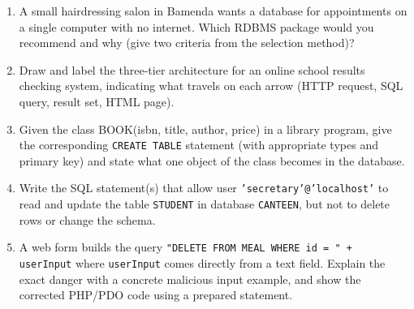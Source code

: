 \documentclass[11pt]{article}
\begin{document}
\begin{exercice}[Practice]
\begin{enumerate}
\item A small hairdressing salon in Bamenda wants a database for appointments on a single computer with no internet. Which RDBMS package would you recommend and why (give two criteria from the selection method)?
\item Draw and label the three-tier architecture for an online school results checking system, indicating what travels on each arrow (HTTP request, SQL query, result set, HTML page).
\item Given the class \textsf{BOOK(isbn, title, author, price)} in a library program, give the corresponding \texttt{CREATE TABLE} statement (with appropriate types and primary key) and state what one object of the class becomes in the database.
\item Write the SQL statement(s) that allow user \texttt{'secretary'@'localhost'} to read and update the table \texttt{STUDENT} in database \texttt{CANTEEN}, but not to delete rows or change the schema.
\item A web form builds the query \texttt{"DELETE FROM MEAL WHERE id = " + userInput} where \texttt{userInput} comes directly from a text field. Explain the exact danger with a concrete malicious input example, and show the corrected PHP/PDO code using a prepared statement.
\end{enumerate}
\end{exercice}
\end{document}
